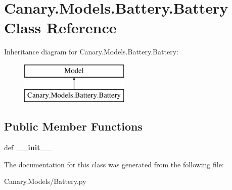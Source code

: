 \hypertarget{class_canary_8_models_1_1_battery_1_1_battery}{\section{Canary.\-Models.\-Battery.\-Battery Class Reference}
\label{class_canary_8_models_1_1_battery_1_1_battery}
}
Inheritance diagram for Canary.\-Models.\-Battery.\-Battery\-:\begin{figure}[H]
\begin{center}
\leavevmode
\includegraphics[height=2.000000cm]{class_canary_8_models_1_1_battery_1_1_battery}
\end{center}
\end{figure}
\subsection*{Public Member Functions}
\begin{DoxyCompactItemize}
\item 
\hypertarget{class_canary_8_models_1_1_battery_1_1_battery_a2830405707e4daea994af09abac9f131}{def {\bfseries \-\_\-\-\_\-init\-\_\-\-\_\-}}\label{class_canary_8_models_1_1_battery_1_1_battery_a2830405707e4daea994af09abac9f131}

\end{DoxyCompactItemize}


The documentation for this class was generated from the following file\-:\begin{DoxyCompactItemize}
\item 
Canary.\-Models/Battery.\-py\end{DoxyCompactItemize}
